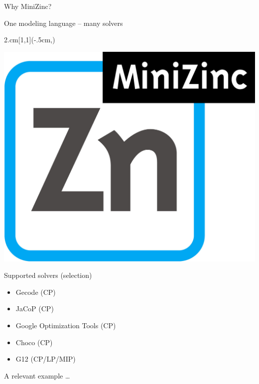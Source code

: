 \begin{frame}{Why MiniZinc?}
\begin{parchment}[Rationale]
\centering 
\alert{One modeling language -- many solvers} 
\end{parchment}
\begin{textblock*}{2.cm}[1,1](\textwidth-.5cm,\textheight-1.03cm)

\includegraphics[width=\textwidth]{img/MiniZn_logo.jpg} 

\end{textblock*}
Supported solvers (selection)
\begin{itemize}
\item Gecode (CP)
\item JaCoP (CP)
\item Google Optimization Tools (CP)
\item Choco (CP)
\item G12 (CP/LP/MIP)
\end{itemize}

\end{frame}

\begin{frame}[fragile]{A relevant example \ldots}
\small

\end{frame}